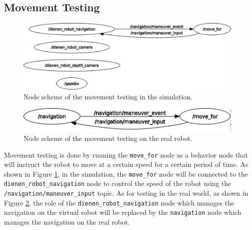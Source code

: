 \subsection{Movement Testing}
\label{subsec:movementtesting}

\begin{figure} [ht]
  \centering
  \includegraphics[scale=0.25]{images/rosgraph-simulation-movement-test.png}
  \caption{Node scheme of the movement testing in the simulation.}
  \label{fig:rosgraphsimulationmovementtest}
\end{figure}

\begin{figure} [ht]
  \centering
  \includegraphics[scale=0.3]{images/rosgraph-real-robot-movement-test.png}
  \caption{Node scheme of the movement testing on the real robot.}
  \label{fig:rosgraphrealrobotmovementtest}
\end{figure}

Movement testing is done by running the \lstinline{move_for} node as a behavior node that will instruct the robot to move at a certain speed for a certain period of time.
As shown in Figure \ref{fig:rosgraphsimulationmovementtest}, in the simulation,
  the \lstinline{move_for} node will be connected to the \lstinline{dienen_robot_navigation} node to control the speed of the robot using the \lstinline{/navigation/maneuver_input} topic.
As for testing in the real world, as shown in Figure \ref{fig:rosgraphrealrobotmovementtest}, the role of the \lstinline{dienen_robot_navigation} node which manages the navigation on the virtual robot will be replaced by the \lstinline{navigation} node which manages the navigation on the real robot.

